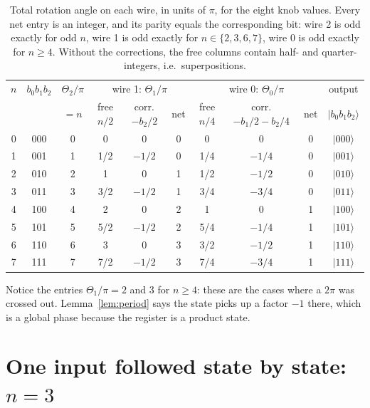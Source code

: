 \documentclass[11pt,a4paper]{article}
\newcommand{\ket}[1]{\lvert #1 \rangle}
\theoremstyle{plain}
\theoremstyle{definition}
\theoremstyle{remark}
\begin{document}
\begin{table}[ht]
\centering\small
\setlength{\tabcolsep}{5pt}
\begin{tabular}{c c c | c c c | c c c | c}
\toprule
$n$ & $b_0b_1b_2$ & $\Theta_2/\pi$ & \multicolumn{3}{c|}{wire 1: $\Theta_1/\pi$} & \multicolumn{3}{c|}{wire 0: $\Theta_0/\pi$} & output \\
    &             & $=n$           & free $n/2$ & corr. $-b_2/2$ & net & free $n/4$ & corr. $-b_1/2-b_2/4$ & net & $\ket{b_0b_1b_2}$\\
\midrule
0 & 000 & 0 & 0    & 0      & 0 & 0    & 0      & 0 & $\ket{000}$\\
1 & 001 & 1 & 1/2  & $-1/2$ & 0 & 1/4  & $-1/4$ & 0 & $\ket{001}$\\
2 & 010 & 2 & 1    & 0      & 1 & 1/2  & $-1/2$ & 0 & $\ket{010}$\\
3 & 011 & 3 & 3/2  & $-1/2$ & 1 & 3/4  & $-3/4$ & 0 & $\ket{011}$\\
4 & 100 & 4 & 2    & 0      & 2 & 1    & 0      & 1 & $\ket{100}$\\
5 & 101 & 5 & 5/2  & $-1/2$ & 2 & 5/4  & $-1/4$ & 1 & $\ket{101}$\\
6 & 110 & 6 & 3    & 0      & 3 & 3/2  & $-1/2$ & 1 & $\ket{110}$\\
7 & 111 & 7 & 7/2  & $-1/2$ & 3 & 7/4  & $-3/4$ & 1 & $\ket{111}$\\
\bottomrule
\end{tabular}
\caption{Total rotation angle on each wire, in units of $\pi$, for the eight knob values. Every
net entry is an integer, and its parity equals the corresponding bit: wire 2 is odd exactly for
odd $n$, wire 1 is odd exactly for $n\in\{2,3,6,7\}$, wire 0 is odd exactly for $n\ge4$. Without
the corrections, the free columns contain half- and quarter-integers, i.e.\ superpositions.}
\label{tab:check}
\end{table}

Notice the entries $\Theta_1/\pi = 2$ and $3$ for $n\ge4$: these are the cases where a $2\pi$ was
crossed out. Lemma~\ref{lem:period} says the state picks up a factor $-1$ there, which is a global
phase because the register is a product state.

\section{One input followed state by state: $n = 3$}\label{sec:example}
\end{document}
